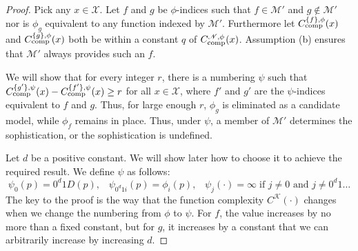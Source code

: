 \documentclass{style/llncs}
\newcommand{\M}{\mathscr M}
\newcommand{\K}{\mathscr K}
\newcommand{\X}{\mathscr X}
\newcommand{\Nm}{\mathscr N}
\newcommand{\tn}[1]{\textnormal{#1}}
\newcommand{\Cc}{C_\tn{comp}}
\begin{document}
\begin{proof}\enlargethispage{2\baselineskip}
Pick any $x \in \X$. Let $f$ and $g$ be $\phi$-indices such that $f \in \M'$ and $g \notin \M'$ nor is $\phi_g$ equivalent to any function indexed by $\M'$. Furthermore let $\Cc^{\{f\}, \phi}(x)$ and $\Cc^{\{g\}, \phi}(x)$ both be within a constant $q$ of $\Cc^{\Nm,\phi}(x)$. Assumption (b) ensures that $\M'$ always provides such an $f$. 

We will show that for every integer $r$, there is a numbering $\psi$ such that $\Cc^{\{g'\}, \psi}(x) - \Cc^{\{f'\}, \psi}(x) \geq r$ for all $x \in \X$, where $f'$ and $g'$ are the $\psi$-indices equivalent to $f$ and $g$. Thus, for large enough $r$, $\phi_g$ is eliminated as a candidate model, while $\phi_f$ remains in place. Thus, under $\psi$, a member of $\M'$ determines the sophistication, or the sophistication is undefined.

Let $d$ be a positive constant. We will show later how to choose it to achieve the required result. We define $\psi$ as follows:
\[
\psi_0(p) = 0^d 1 D(p), \;\;\;
\psi_{0^d1i}(p) = \phi_i(p), \;\;\;
\psi_j(\cdot) = \infty \;\text{if $j\neq 0$ and $j \neq 0^d1\ldots$}
\]
The key to the proof is the way that the function complexity $C^\K(\cdot)$ changes when we change the numbering from $\phi$ to $\psi$. For $f$, the value increases by no more than a fixed constant, but for $g$, it increases by a constant that we can arbitrarily increase by increasing $d$.


\end{proof}
\end{document}
